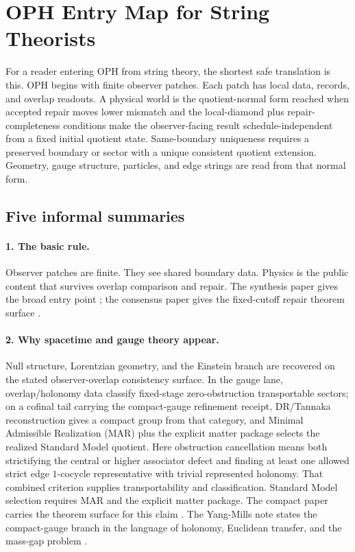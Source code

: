 \documentclass[11pt]{article}
\theoremstyle{remark}
\theoremstyle{plain}
\begin{document}
\section{OPH Entry Map for String Theorists}

For a reader entering OPH from string theory, the shortest safe translation is this. OPH begins
with finite observer patches. Each patch has local data, records, and overlap readouts. A physical
world is the quotient-normal form reached when accepted repair moves lower mismatch and the
local-diamond plus repair-completeness conditions make the observer-facing result
schedule-independent from a fixed initial quotient state. Same-boundary uniqueness requires a
preserved boundary or sector with a unique consistent quotient extension.
Geometry, gauge structure, particles, and edge strings are read from that normal form.

\subsection{Five informal summaries}

\paragraph{1. The basic rule.}
Observer patches are finite. They see shared boundary data. Physics is the public content that
survives overlap comparison and repair. The synthesis paper gives the broad entry point
\cite{OPHObserversAllYouNeed}; the consensus paper gives the fixed-cutoff repair theorem surface
\cite{OPHRealityConsensus}.

\paragraph{2. Why spacetime and gauge theory appear.}
Null structure, Lorentzian geometry, and the Einstein branch are recovered on the stated
observer-overlap consistency surface. In the gauge lane, overlap/holonomy data classify
fixed-stage zero-obstruction transportable sectors; on a cofinal tail carrying the compact-gauge
refinement receipt, DR/Tannaka reconstruction gives a compact group from that
category, and Minimal Admissible Realization (MAR) plus the explicit matter package selects the realized Standard Model quotient.
Here obstruction cancellation means both strictifying the central or higher associator defect and
finding at least one allowed strict edge \(1\)-cocycle representative with trivial represented
holonomy. That combined
criterion supplies transportability and classification. Standard Model
selection requires MAR and the explicit matter package.
The compact paper carries the theorem surface for this claim \cite{OPHCompactCore}. The Yang-Mills note
states the compact-gauge branch in the language of holonomy, Euclidean transfer, and the mass-gap
problem \cite{OPHYangMillsGap}.
\end{document}

